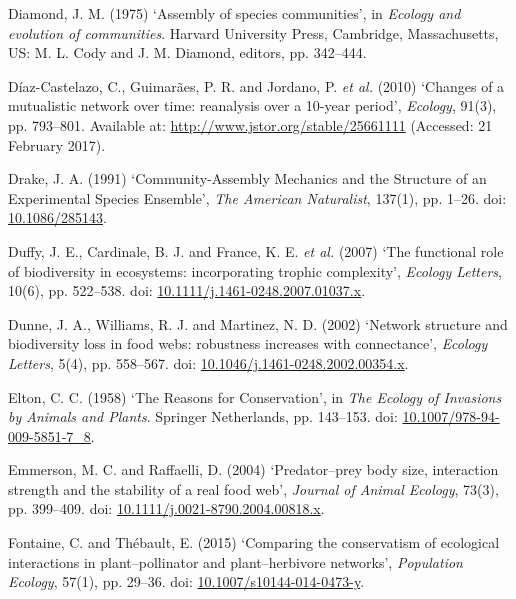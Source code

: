 \documentclass[12pt]{article}
\begin{document}
\hypertarget{ref-diam75asc}{}
Diamond, J. M. (1975) `Assembly of species communities', in
\emph{Ecology and evolution of communities}. Harvard University Press,
Cambridge, Massachusetts, US: M. L. Cody and J. M. Diamond, editors, pp.
342--444.

\hypertarget{ref-diaz10cmn}{}
Díaz-Castelazo, C., Guimarães, P. R. and Jordano, P. \emph{et al.}
(2010) `Changes of a mutualistic network over time: reanalysis over a
10-year period', \emph{Ecology}, 91(3), pp. 793--801. Available at:
\url{http://www.jstor.org/stable/25661111} (Accessed: 21 February 2017).

\hypertarget{ref-drak91cms}{}
Drake, J. A. (1991) `Community-Assembly Mechanics and the Structure of
an Experimental Species Ensemble', \emph{The American Naturalist},
137(1), pp. 1--26. doi:
\href{https://doi.org/10.1086/285143}{10.1086/285143}.

\hypertarget{ref-duff07frb}{}
Duffy, J. E., Cardinale, B. J. and France, K. E. \emph{et al.} (2007)
`The functional role of biodiversity in ecosystems: incorporating
trophic complexity', \emph{Ecology Letters}, 10(6), pp. 522--538. doi:
\href{https://doi.org/10.1111/j.1461-0248.2007.01037.x}{10.1111/j.1461-0248.2007.01037.x}.

\hypertarget{ref-dunn02nsb}{}
Dunne, J. A., Williams, R. J. and Martinez, N. D. (2002) `Network
structure and biodiversity loss in food webs: robustness increases with
connectance', \emph{Ecology Letters}, 5(4), pp. 558--567. doi:
\href{https://doi.org/10.1046/j.1461-0248.2002.00354.x}{10.1046/j.1461-0248.2002.00354.x}.

\hypertarget{ref-elto58rc}{}
Elton, C. C. (1958) `The Reasons for Conservation', in \emph{The Ecology
of Invasions by Animals and Plants}. Springer Netherlands, pp. 143--153.
doi:
\href{https://doi.org/10.1007/978-94-009-5851-7_8}{10.1007/978-94-009-5851-7\_8}.

\hypertarget{ref-emme04pbs}{}
Emmerson, M. C. and Raffaelli, D. (2004) `Predator--prey body size,
interaction strength and the stability of a real food web',
\emph{Journal of Animal Ecology}, 73(3), pp. 399--409. doi:
\href{https://doi.org/10.1111/j.0021-8790.2004.00818.x}{10.1111/j.0021-8790.2004.00818.x}.

\hypertarget{ref-font15cce}{}
Fontaine, C. and Thébault, E. (2015) `Comparing the conservatism of
ecological interactions in plant--pollinator and plant--herbivore
networks', \emph{Population Ecology}, 57(1), pp. 29--36. doi:
\href{https://doi.org/10.1007/s10144-014-0473-y}{10.1007/s10144-014-0473-y}.
\end{document}
